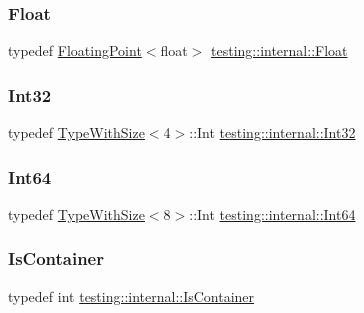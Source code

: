 \subsubsection{\texorpdfstring{Float}{Float}}
{\footnotesize\ttfamily typedef \mbox{\hyperlink{classtesting_1_1internal_1_1_floating_point}{Floating\+Point}}$<$float$>$ \mbox{\hyperlink{namespacetesting_1_1internal_a02e1981f5ff70609e6ac06e006ff519a}{testing\+::internal\+::\+Float}}}

\mbox{\label{namespacetesting_1_1internal_a8ee38faaf875f133358abaf9bc056cec}} 
\subsubsection{\texorpdfstring{Int32}{Int32}}
{\footnotesize\ttfamily typedef \mbox{\hyperlink{classtesting_1_1internal_1_1_type_with_size}{Type\+With\+Size}}$<$4$>$\+::Int \mbox{\hyperlink{namespacetesting_1_1internal_a8ee38faaf875f133358abaf9bc056cec}{testing\+::internal\+::\+Int32}}}

\mbox{\label{namespacetesting_1_1internal_a271c563fec38b804ddab0677f51f70a8}} 
\subsubsection{\texorpdfstring{Int64}{Int64}}
{\footnotesize\ttfamily typedef \mbox{\hyperlink{classtesting_1_1internal_1_1_type_with_size}{Type\+With\+Size}}$<$8$>$\+::Int \mbox{\hyperlink{namespacetesting_1_1internal_a271c563fec38b804ddab0677f51f70a8}{testing\+::internal\+::\+Int64}}}

\mbox{\label{namespacetesting_1_1internal_ad8f0c2883245f1df2a53618a49f0deb3}} 
\subsubsection{\texorpdfstring{IsContainer}{IsContainer}}
{\footnotesize\ttfamily typedef int \mbox{\hyperlink{namespacetesting_1_1internal_ad8f0c2883245f1df2a53618a49f0deb3}{testing\+::internal\+::\+Is\+Container}}}

